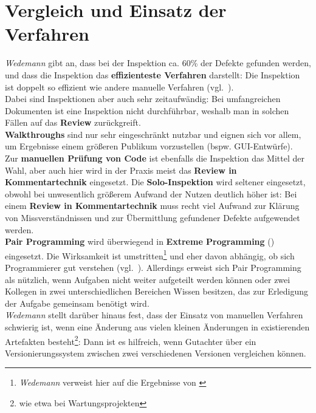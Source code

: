 \section{Vergleich und Einsatz der Verfahren}
\textit{Wedemann} gibt an, dass bei der Inspektion ca. 60\% der Defekte gefunden werden, und dass die Inspektion das \textbf{effizienteste Verfahren} darstellt: Die Inspektion ist doppelt so effizient wie andere manuelle Verfahren (vgl.~\cite[25]{Wed09c}).\\

\noindent
Dabei sind Inspektionen aber auch sehr zeitaufwändig: Bei umfangreichen Dokumenten ist eine Inspektion nicht durchführbar, weshalb man in solchen Fällen auf das \textbf{Review} zurückgreift.\\
\textbf{Walkthroughs} sind nur sehr eingeschränkt nutzbar und eignen sich vor allem, um Ergebnisse einem größeren Publikum vorzustellen (bspw. GUI-Entwürfe).\\

\noindent
Zur \textbf{manuellen Prüfung von Code} ist ebenfalls die Inspektion das Mittel der Wahl, aber auch hier wird in der Praxis meist das \textbf{Review in Kommentartechnik} eingesetzt.
Die \textbf{Solo-Inspektion} wird seltener eingesetzt, obwohl bei unwesentlich größerem Aufwand der Nutzen deutlich höher ist: Bei einem \textbf{Review in Kommentartechnik} muss recht viel Aufwand zur Klärung von Missverständnissen und zur Übermittlung gefundener Defekte aufgewendet werden.\\

\noindent
\textbf{Pair Programming} wird überwiegend in \textbf{Extreme Programming} (\cite{BA04}) eingesetzt. Die Wirksamkeit ist umstritten\footnote{
\textit{Wedemann} verweist hier auf die Ergebnisse von \cite{MPT05}
} und eher davon abhängig, ob sich Programmierer gut verstehen (vgl.~\cite[25]{Wed09c}). Allerdings erweist sich Pair Programming als nützlich, wenn Aufgaben nicht weiter aufgeteilt werden können oder zwei Kollegen in zwei unterschiedlichen Bereichen Wissen besitzen, das zur Erledigung der Aufgabe gemeinsam benötigt wird.\\

\noindent
\textit{Wedemann} stellt darüber hinaus fest, dass der Einsatz von manuellen Verfahren schwierig ist, wenn eine Änderung aus vielen kleinen Änderungen in existierenden Artefakten besteht\footnote{
wie etwa bei Wartungsprojekten
}: Dann ist es hilfreich, wenn Gutachter über ein Versionierungssystem zwischen zwei verschiedenen Versionen vergleichen können.